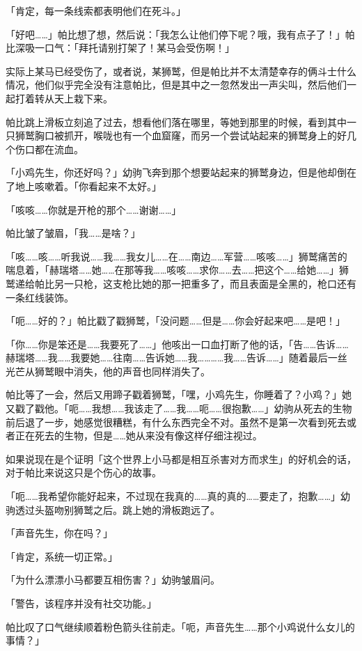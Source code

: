 「{\mt 肯定，每一条线索都表明他们在死斗。}」

「好吧……」帕比想了想，然后说：「我怎么让他们停下呢？哦，我有点子了！」帕比深吸一口气：「拜托请别打架了！某马会受伤啊！」

实际上某马已经受伤了，或者说，某狮鹫，但是帕比并不太清楚幸存的俩斗士什么情况，他们似乎完全没有注意帕比，但是其中之一忽然发出一声尖叫，然后他们一起打着转从天上栽下来。

帕比跳上滑板立刻追了过去，想看他们落在哪里，等她到那里的时候，看到其中一只狮鹫胸口被抓开，喉咙也有一个血窟窿，而另一个尝试站起来的狮鹫身上的好几个伤口都在流血。

「小鸡先生，你还好吗？」幼驹飞奔到那个想要站起来的狮鹫身边，但是他却倒在了地上咳嗽着。「你看起来不太好。」

「咳咳……你就是开枪的那个……谢谢……」

帕比皱了皱眉，「我……是啥？」

「咳……咳……听我说……我……我女儿……在……南边……军营……咳咳……」狮鹫痛苦的喘息着，「赫瑞塔……她……在那等我……咳咳……求你……去……把这个……给她……」狮鹫递给帕比另一只枪，这支枪比她的那一把重多了，而且表面是全黑的，枪口还有一条红线装饰。


「呃……好的？」帕比戳了戳狮鹫，「没问题……但是……你会好起来吧……是吧！」

「你……你是笨还是……我要死了……」他咳出一口血打断了他的话，「告……告诉……赫瑞塔……我……我要她……往南……告诉她……我…………我……告诉……」随着最后一丝光芒从狮鹫眼中消失，他的声音也同样消失了。

帕比等了一会，然后又用蹄子戳着狮鹫，「嘿，小鸡先生，你睡着了？小鸡？」她又戳了戳他。「呃……我想……我该走了……我……呃……很抱歉……」幼驹从死去的生物前后退了一步，她感觉很糟糕，有什么东西完全不对。虽然不是第一次看到死去或者正在死去的生物，但是……她从来没有像这样仔细注视过。

如果说现在是个证明「这个世界上小马都是相互杀害对方而求生」的好机会的话，对于帕比来说这只是个伤心的故事。

「呃……我希望你能好起来，不过现在我真的……真的真的……要走了，抱歉……」幼驹透过头盔吻别狮鹫之后。跳上她的滑板跑远了。

「声音先生，你在吗？」

「{\mt 肯定，系统一切正常。}」

「为什么漂漂小马都要互相伤害？」幼驹皱眉问。

「{\mt 警告，该程序并没有社交功能。}」

帕比叹了口气继续顺着粉色箭头往前走。「呃，声音先生……那个小鸡说什么女儿的事情？」

